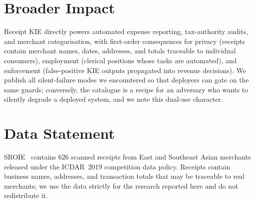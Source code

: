 \section*{Broader Impact}

Receipt KIE directly powers automated expense reporting,
tax-authority audits, and merchant categorisation, with first-order
consequences for privacy (receipts contain merchant names, dates,
addresses, and totals traceable to individual consumers), employment
(clerical positions whose tasks are automated), and enforcement
(false-positive KIE outputs propagated into revenue decisions).
We publish all silent-failure modes we encountered so that deployers
can gate on the same guards; conversely, the catalogue is a recipe
for an adversary who wants to silently degrade a deployed system,
and we note this dual-use character.

\section*{Data Statement}

SROIE~\cite{huang2019icdar} contains 626 scanned receipts from East
and Southeast Asian merchants released under the ICDAR~2019
competition data policy.  Receipts contain business names,
addresses, and transaction totals that may be traceable to real
merchants; we use the data strictly for the research reported here
and do not redistribute it.
